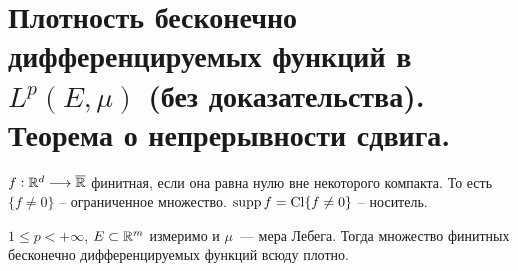 \section{Плотность бесконечно дифференцируемых функций в $L^p(E, \mu)$ (без доказательства). Теорема о непрерывности сдвига.}

\begin{conj}
    $f: \mathbb{R}^d \longrightarrow \overline{\mathbb{R}}$ финитная, если она равна нулю вне некоторого компакта. То есть $\{f \neq 0\}$ -- ограниченное множество. $\operatorname{supp} f = \operatorname{Cl} \{f \neq 0\}$ -- носитель. 
\end{conj}

\begin{theorem}
    $1 \le p < +\infty$, $E \subset \mathbb{R}^m$ измеримо и $\mu$~--- мера Лебега.
    Тогда множество финитных бесконечно дифференцируемых функций всюду плотно.
\end{theorem}

